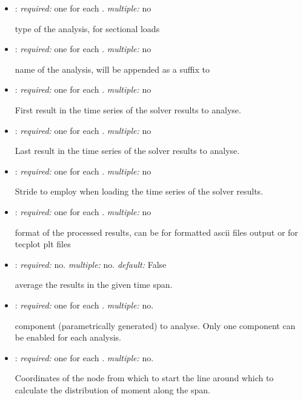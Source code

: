 \begin{itemize}
\item {}: \textit{required:} one for each . \textit{multiple:} no

type of the analysis,  for sectional loads

\item {}: \textit{required:} one for each . \textit{multiple:} no

name of the analysis, will be appended as a suffix to 

\item {}: \textit{required:} one for each . \textit{multiple:} no

First result in the time series of the solver results to analyse.

\item {}: \textit{required:} one for each . \textit{multiple:} no

Last result in the time series of the solver results to analyse.

\item {}: \textit{required:} one for each . \textit{multiple:} no

Stride to employ when loading the time series of the solver results. 

\item {}: \textit{required:} one for each . \textit{multiple:} no

format of the processed results, can be  for formatted ascii files output or  for tecplot plt files

\item {}: \textit{required:} no. \textit{multiple:} no. \textit{default:} False

average the results in the given time span.

\item {}: \textit{required:} one for each . \textit{multiple:} no.

component (parametrically generated) to analyse. Only one component can be enabled for each analysis. 

\item {}: \textit{required:} one for each . \textit{multiple:} no.

Coordinates of the node from which to start the line around which to calculate the distribution of moment along the span.


\end{itemize}
